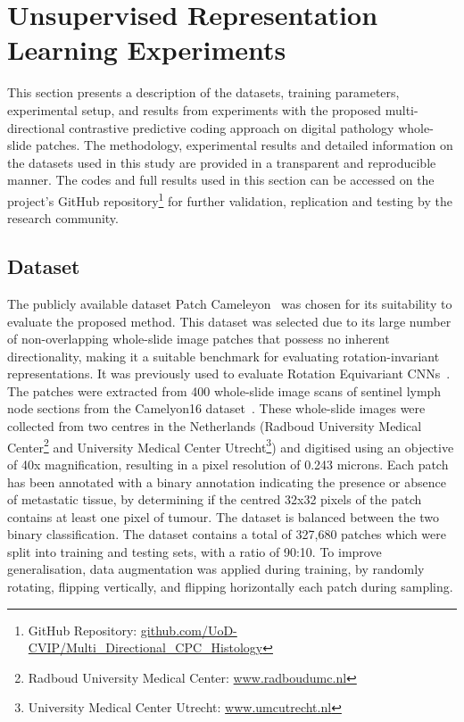 \section{Unsupervised Representation Learning Experiments}
\label{sec:unsupervised_experiments}
This section presents a description of the datasets, training parameters, experimental setup, and results from experiments with the proposed multi-directional contrastive predictive coding approach on digital pathology whole-slide patches. The methodology, experimental results and detailed information on the datasets used in this study are provided in a transparent and reproducible manner. The codes and full results used in this section can be accessed on the project's GitHub repository\footnote{GitHub Repository: \url{github.com/UoD-CVIP/Multi_Directional_CPC_Histology}} for further validation, replication and testing by the research community.

\subsection{Dataset}
\label{subsec:unsupervised_dataset}
The publicly available dataset Patch Cameleyon~\citep{veeling2018rotation} was chosen for its suitability to evaluate the proposed method. This dataset was selected due to its large number of non-overlapping whole-slide image patches that possess no inherent directionality, making it a suitable benchmark for evaluating rotation-invariant representations. It was previously used to evaluate Rotation Equivariant CNNs~\citep{veeling2018rotation}. The patches were extracted from 400 whole-slide image scans of sentinel lymph node sections from the Camelyon16 dataset~\citep{litjens20181399}. These whole-slide images were collected from two centres in the Netherlands (Radboud University Medical Center\footnote{Radboud University Medical Center: \url{www.radboudumc.nl}} and University Medical Center Utrecht\footnote{University Medical Center Utrecht: \url{www.umcutrecht.nl}}) and digitised using an objective of 40x magnification, resulting in a pixel resolution of 0.243 microns. Each patch has been annotated with a binary annotation indicating the presence or absence of metastatic tissue, by determining if the centred 32x32 pixels of the patch contains at least one pixel of tumour. The dataset is balanced between the two binary classification. The dataset contains a total of 327,680 patches which were split into training and testing sets, with a ratio of 90:10. To improve generalisation, data augmentation was applied during training, by randomly rotating, flipping vertically, and flipping horizontally each patch during sampling.

